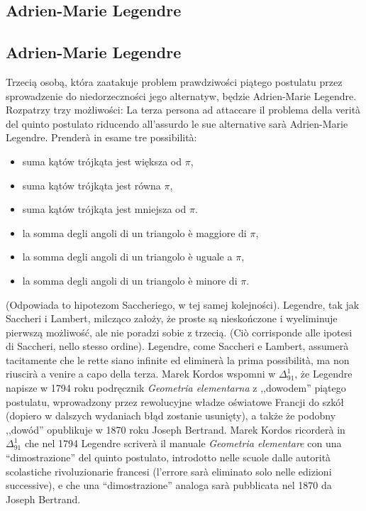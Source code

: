 %

\subsection{Adrien-Marie Legendre} %
\subsection{Adrien-Marie Legendre} %
\label{sekcja_legendre}

Trzecią osobą, która zaatakuje problem prawdziwości piątego postulatu przez sprowadzenie do niedorzeczności jego alternatyw, będzie Adrien-Marie Legendre. %
Rozpatrzy trzy możliwości: %
La terza persona ad attaccare il problema della verità del quinto postulato riducendo all'assurdo le sue alternative sarà Adrien-Marie Legendre. %
Prenderà in esame tre possibilità: %
\begin{itemize}
    \item suma kątów trójkąta jest większa od $\pi$, %
    \item suma kątów trójkąta jest równa $\pi$, %
    \item suma kątów trójkąta jest mniejsza od $\pi$. %
    \item la somma degli angoli di un triangolo è maggiore di $\pi$, %
    \item la somma degli angoli di un triangolo è uguale a $\pi$, %
    \item la somma degli angoli di un triangolo è minore di $\pi$. %
\end{itemize}
(Odpowiada to hipotezom Saccheriego, w tej samej kolejności). %
Legendre, tak jak Saccheri i Lambert, milcząco założy, że proste są nieskończone i wyeliminuje pierwszą możliwość, ale nie poradzi sobie z trzecią. %
(Ciò corrisponde alle ipotesi di Saccheri, nello stesso ordine). %
Legendre, come Saccheri e Lambert, assumerà tacitamente che le rette siano infinite ed eliminerà la prima possibilità, ma non riuscirà a venire a capo della terza. %
Marek Kordos wspomni w $\Delta_{91}^{1}$, że Legendre napisze w 1794 roku podręcznik \emph{Geometria elementarna} z ,,dowodem'' piątego postulatu, wprowadzony przez rewolucyjne władze oświatowe Francji do szkół (dopiero w dalszych wydaniach błąd zostanie usunięty), a także że podobny ,,dowód'' opublikuje w 1870 roku Joseph Bertrand. %
Marek Kordos ricorderà in $\Delta_{91}^{1}$ che nel 1794 Legendre scriverà il manuale \emph{Geometria elementare} con una ``dimostrazione'' del quinto postulato, introdotto nelle scuole dalle autorità scolastiche rivoluzionarie francesi (l'errore sarà eliminato solo nelle edizioni successive), e che una ``dimostrazione'' analoga sarà pubblicata nel 1870 da Joseph Bertrand. %

